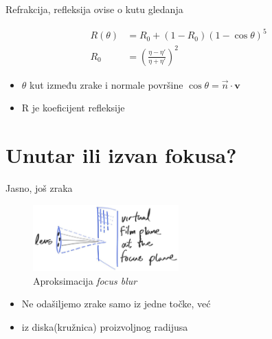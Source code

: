 \documentclass[9pt]{beamer}
\begin{document}
\begin{frame}{Refrakcija, refleksija ovise o kutu gledanja}

\begin{align*}
	R(\theta) &= R_0 + (1-R_0)(1-\cos\theta)^5 \\
	R_0 &= \left(\frac{\eta - \eta'}{\eta + \eta'}\right)^2
\end{align*}
\begin{itemize}
	\item $\theta$ kut između zrake i normale površine $\cos\theta = \vec{n}\cdot\mathbf{v}$
	\item R je koeficijent refleksije
\end{itemize}
\end{frame}

\section{Unutar ili izvan fokusa?}
\begin{frame}{Jasno, još zraka}
\begin{figure}
	\includegraphics[width=0.5\textwidth]{./slike/cam-film-plane.png}
	\caption{Aproksimacija \textit{focus blur}}
\end{figure}
\begin{itemize}
	\item Ne odašiljemo zrake samo iz jedne točke, već
	\item iz diska(kružnica) proizvoljnog radijusa 
\end{itemize}
\end{frame}
\end{document}
